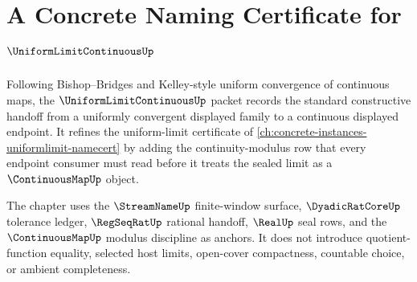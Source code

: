 \chapter{A Concrete Naming Certificate for $\UniformLimitContinuousUp$}
\label{ch:concrete-instances-uniform-limit-continuous-namecert}

Following Bishop--Bridges and Kelley-style uniform convergence of continuous maps, the $\UniformLimitContinuousUp$ packet records the standard constructive handoff from a uniformly convergent displayed family to a continuous displayed endpoint. It refines the uniform-limit certificate of \autoref{ch:concrete-instances-uniformlimit-namecert} by adding the continuity-modulus row that every endpoint consumer must read before it treats the sealed limit as a $\ContinuousMapUp$ object.

The chapter uses the $\StreamNameUp$ finite-window surface, $\DyadicRatCoreUp$ tolerance ledger, $\RegSeqRatUp$ rational handoff, $\RealUp$ seal rows, and the $\ContinuousMapUp$ modulus discipline as anchors. It does not introduce quotient-function equality, selected host limits, open-cover compactness, countable choice, or ambient completeness.

